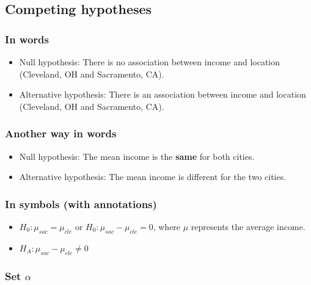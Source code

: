 \documentclass[12pt,]{krantz}
\providecommand{\tightlist}{%
  \setlength{\itemsep}{0pt}\setlength{\parskip}{0pt}}
\begin{document}
\subsection{Competing hypotheses}\label{competing-hypotheses-3}

\subsubsection*{In words}\label{in-words-3}


\begin{itemize}
\item
  Null hypothesis: There is no association between income and location
  (Cleveland, OH and Sacramento, CA).
\item
  Alternative hypothesis: There is an association between income and
  location (Cleveland, OH and Sacramento, CA).
\end{itemize}

\subsubsection*{Another way in words}\label{another-way-in-words-1}


\begin{itemize}
\item
  Null hypothesis: The mean income is the \textbf{same} for both cities.
\item
  Alternative hypothesis: The mean income is different for the two
  cities.
\end{itemize}

\subsubsection*{In symbols (with
annotations)}\label{in-symbols-with-annotations-3}


\begin{itemize}
\tightlist
\item
  \(H_0: \mu_{sac} = \mu_{cle}\) or \(H_0: \mu_{sac} - \mu_{cle} = 0\),
  where \(\mu\) represents the average income.
\item
  \(H_A: \mu_{sac} - \mu_{cle} \ne 0\)
\end{itemize}

\subsubsection*{\texorpdfstring{Set
\(\alpha\)}{Set \textbackslash{}alpha}}\label{set-alpha-3}
\end{document}

